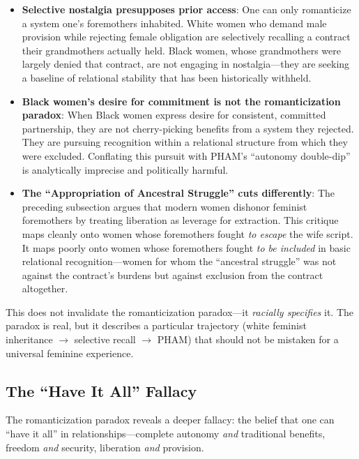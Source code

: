 \documentclass[12pt, letterpaper]{article}
\begin{document}
\begin{itemize}
    \item \textbf{Selective nostalgia presupposes prior access}: One can only romanticize a system one's foremothers inhabited. White women who demand male provision while rejecting female obligation are selectively recalling a contract their grandmothers actually held. Black women, whose grandmothers were largely denied that contract, are not engaging in nostalgia---they are seeking a baseline of relational stability that has been historically withheld.
    
    \item \textbf{Black women's desire for commitment is not the romanticization paradox}: When Black women express desire for consistent, committed partnership, they are not cherry-picking benefits from a system they rejected. They are pursuing recognition within a relational structure from which they were excluded. Conflating this pursuit with PHAM's ``autonomy double-dip'' is analytically imprecise and politically harmful.
    
    \item \textbf{The ``Appropriation of Ancestral Struggle'' cuts differently}: The preceding subsection argues that modern women dishonor feminist foremothers by treating liberation as leverage for extraction. This critique maps cleanly onto women whose foremothers fought \textit{to escape} the wife script. It maps poorly onto women whose foremothers fought \textit{to be included} in basic relational recognition---women for whom the ``ancestral struggle'' was not against the contract's burdens but against exclusion from the contract altogether.
\end{itemize}

This does not invalidate the romanticization paradox---it \textit{racially specifies} it. The paradox is real, but it describes a particular trajectory (white feminist inheritance $\to$ selective recall $\to$ PHAM) that should not be mistaken for a universal feminine experience.

\subsection{The ``Have It All'' Fallacy}

The romanticization paradox reveals a deeper fallacy: the belief that one can ``have it all'' in relationships---complete autonomy \textit{and} traditional benefits, freedom \textit{and} security, liberation \textit{and} provision.
\end{document}
